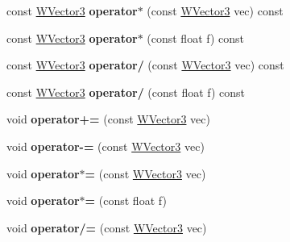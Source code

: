 \begin{DoxyCompactItemize}
\item 
const \hyperlink{class_w_vector3}{W\+Vector3} {\bfseries operator$\ast$} (const \hyperlink{class_w_vector3}{W\+Vector3} vec) const \hypertarget{class_w_vector3_a5b81ddee9c658a0707bbd48230da3fd6}{}\label{class_w_vector3_a5b81ddee9c658a0707bbd48230da3fd6}

\item 
const \hyperlink{class_w_vector3}{W\+Vector3} {\bfseries operator$\ast$} (const float f) const \hypertarget{class_w_vector3_adf3ba04bc5d34ce27034a96f4e2a2867}{}\label{class_w_vector3_adf3ba04bc5d34ce27034a96f4e2a2867}

\item 
const \hyperlink{class_w_vector3}{W\+Vector3} {\bfseries operator/} (const \hyperlink{class_w_vector3}{W\+Vector3} vec) const \hypertarget{class_w_vector3_ac50dbe664a9cccadbae0c2d5d576c24d}{}\label{class_w_vector3_ac50dbe664a9cccadbae0c2d5d576c24d}

\item 
const \hyperlink{class_w_vector3}{W\+Vector3} {\bfseries operator/} (const float f) const \hypertarget{class_w_vector3_ae3d3a6bd62d70b72b5078557facc7646}{}\label{class_w_vector3_ae3d3a6bd62d70b72b5078557facc7646}

\item 
void {\bfseries operator+=} (const \hyperlink{class_w_vector3}{W\+Vector3} vec)\hypertarget{class_w_vector3_a428afac4f61419387bbd076db6664a41}{}\label{class_w_vector3_a428afac4f61419387bbd076db6664a41}

\item 
void {\bfseries operator-\/=} (const \hyperlink{class_w_vector3}{W\+Vector3} vec)\hypertarget{class_w_vector3_a4d002632e7cb07f2dffac2bf1e947e84}{}\label{class_w_vector3_a4d002632e7cb07f2dffac2bf1e947e84}

\item 
void {\bfseries operator$\ast$=} (const \hyperlink{class_w_vector3}{W\+Vector3} vec)\hypertarget{class_w_vector3_ab767c00936a6a16547845cc8c86cab24}{}\label{class_w_vector3_ab767c00936a6a16547845cc8c86cab24}

\item 
void {\bfseries operator$\ast$=} (const float f)\hypertarget{class_w_vector3_a05584a2ff0d9ee2b057b34649b2887ba}{}\label{class_w_vector3_a05584a2ff0d9ee2b057b34649b2887ba}

\item 
void {\bfseries operator/=} (const \hyperlink{class_w_vector3}{W\+Vector3} vec)\hypertarget{class_w_vector3_a7d0dfd629ae1f5abd363064c7a4d87b6}{}\label{class_w_vector3_a7d0dfd629ae1f5abd363064c7a4d87b6}


\end{DoxyCompactItemize}
